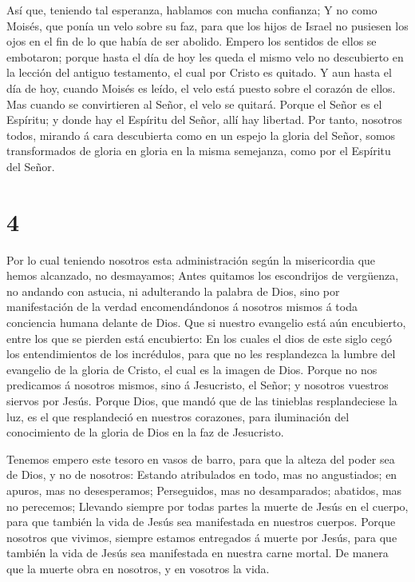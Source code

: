  Así que, teniendo tal esperanza, hablamos con mucha
confianza;  Y no como Moisés, que ponía un velo sobre su
faz, para que los hijos de Israel no pusiesen los ojos en el fin de lo
que había de ser abolido.  Empero los sentidos de ellos se
embotaron; porque hasta el día de hoy les queda el mismo velo no
descubierto en la lección del antiguo testamento, el cual por Cristo es
quitado.  Y aun hasta el día de hoy, cuando Moisés es
leído, el velo está puesto sobre el corazón de ellos.  Mas
cuando se convirtieren al Señor, el velo se quitará. 
Porque el Señor es el Espíritu; y donde hay el Espíritu del Señor, allí
hay libertad.  Por tanto, nosotros todos, mirando á cara
descubierta como en un espejo la gloria del Señor, somos transformados
de gloria en gloria en la misma semejanza, como por el Espíritu del
Señor.

\hypertarget{section-3}{%
\section{4}\label{section-3}}

 Por lo cual teniendo nosotros esta administración según la
misericordia que hemos alcanzado, no desmayamos;  Antes
quitamos los escondrijos de vergüenza, no andando con astucia, ni
adulterando la palabra de Dios, sino por manifestación de la verdad
encomendándonos á nosotros mismos á toda conciencia humana delante de
Dios.  Que si nuestro evangelio está aún encubierto, entre
los que se pierden está encubierto:  En los cuales el dios
de este siglo cegó los entendimientos de los incrédulos, para que no les
resplandezca la lumbre del evangelio de la gloria de Cristo, el cual es
la imagen de Dios.  Porque no nos predicamos á nosotros
mismos, sino á Jesucristo, el Señor; y nosotros vuestros siervos por
Jesús.  Porque Dios, que mandó que de las tinieblas
resplandeciese la luz, es el que resplandeció en nuestros corazones,
para iluminación del conocimiento de la gloria de Dios en la faz de
Jesucristo.

 Tenemos empero este tesoro en vasos de barro, para que la
alteza del poder sea de Dios, y no de nosotros:  Estando
atribulados en todo, mas no angustiados; en apuros, mas no desesperamos;
 Perseguidos, mas no desamparados; abatidos, mas no
perecemos;  Llevando siempre por todas partes la muerte de
Jesús en el cuerpo, para que también la vida de Jesús sea manifestada en
nuestros cuerpos.  Porque nosotros que vivimos, siempre
estamos entregados á muerte por Jesús, para que también la vida de Jesús
sea manifestada en nuestra carne mortal.  De manera que la
muerte obra en nosotros, y en vosotros la vida.

